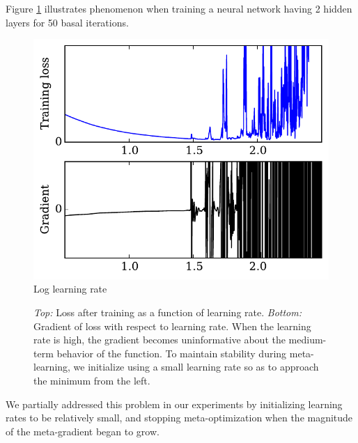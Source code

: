 \documentclass{article}
\newcommand{\primal}{basal }
\begin{document}
Figure \ref{fig:chaos} illustrates phenomenon when training a neural network having 2 hidden layers for 50 \primal{} iterations.
%
\begin{figure}[t]
\vskip 0.2in
\begin{center}
\includegraphics[width=\columnwidth]{../experiments/Jan_14_learning_rate_wiggliness/3/chaos.pdf}
\vskip -0.1in
Log learning rate
\caption{\emph{Top:} Loss after training as a function of learning rate.
\emph{Bottom:} Gradient of loss with respect to learning rate.
When the learning rate is high, the gradient becomes uninformative about the medium-term behavior of the function.
To maintain stability during meta-learning, we initialize using a small learning rate so as to approach the minimum from the left.}
\label{fig:chaos}
\end{center}
\vskip -0.2in
\end{figure} 
%
We partially addressed this problem in our experiments by initializing learning rates to be relatively small, and stopping meta-optimization when the magnitude of the meta-gradient began to grow.


\end{document}
